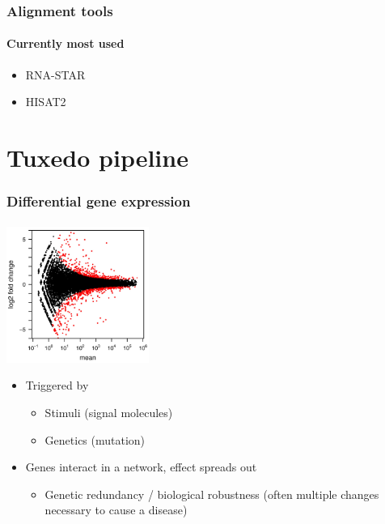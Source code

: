 \documentclass{beamer}			  %
\begin{document}
\begin{frame}
\frametitle{Alignment tools}
\framesubtitle{Currently most used}
	\begin{itemize}
		\item RNA-STAR\cite{star}
		\item HISAT2\cite{hisat}
	\end{itemize}
\end{frame}

\section{Tuxedo pipeline}

\begin{frame}
	\frametitle{Differential gene expression}
	\framesubtitle{}
	\includegraphics[width=0.35\textwidth]{figures/diff_expr.jpg}\\
	\begin{itemize}
		\item Triggered by
		\begin{itemize}
			\item Stimuli (signal molecules)
			\item Genetics (mutation)
		\end{itemize}
		\item Genes interact in a network, effect spreads out
		\begin{itemize}
			\item Genetic redundancy / biological robustness (often multiple changes necessary to cause a disease)
		\end{itemize}
	\end{itemize}
\end{frame}
  
\end{document}
